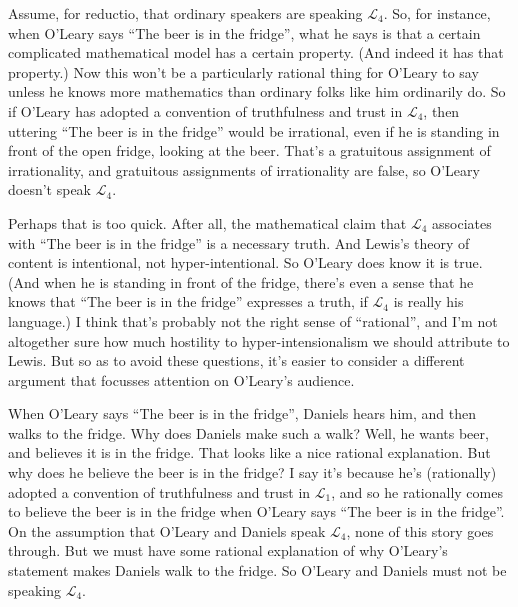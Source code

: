 Assume, for reductio, that ordinary speakers are speaking $\mathcal{L}_4$. So, for instance, when O'Leary says ``The beer is in the fridge'', what he says is that a certain complicated mathematical model has a certain property. (And indeed it has that property.) Now this won't be a particularly rational thing for O'Leary to say unless he knows more mathematics than ordinary folks like him ordinarily do. So if O'Leary has adopted a convention of truthfulness and trust in $\mathcal{L}_4$, then uttering ``The beer is in the fridge'' would be irrational, even if he is standing in front of the open fridge, looking at the beer. That's a gratuitous assignment of irrationality, and gratuitous assignments of irrationality are false, so O'Leary doesn't speak $\mathcal{L}_4$.

Perhaps that is too quick. After all, the mathematical claim that $\mathcal{L}_4$ associates with ``The beer is in the fridge'' is a necessary truth. And Lewis's theory of content is intentional, not hyper-intentional. So O'Leary does know it is true. (And when he is standing in front of the fridge, there's even a sense that he knows that ``The beer is in the fridge'' expresses a truth, if $\mathcal{L}_4$ is really his language.) I think that's probably not the right sense of ``rational'', and I'm not altogether sure how much hostility to hyper-intensionalism we should attribute to Lewis. But so as to avoid these questions, it's easier to consider a different argument that focusses attention on O'Leary's audience.

When O'Leary says ``The beer is in the fridge'', Daniels hears him, and then walks to the fridge. Why does Daniels make such a walk? Well, he wants beer, and believes it is in the fridge. That looks like a nice rational explanation. But why does he believe the beer is in the fridge? I say it's because he's (rationally) adopted a convention of truthfulness and trust in $\mathcal{L}_1$, and so he rationally comes to believe the beer is in the fridge when O'Leary says ``The beer is in the fridge''. On the assumption that O'Leary and Daniels speak $\mathcal{L}_4$, none of this story goes through. But we must have some rational explanation of why O'Leary's statement makes Daniels walk to the fridge. So O'Leary and Daniels must not be speaking $\mathcal{L}_4$.

